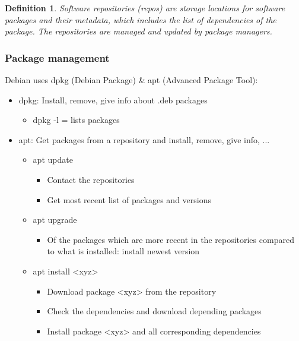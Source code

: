\documentclass{article}
\newtheorem{theorem}{Definition}[section]
\begin{document}
\begin{theorem}
    Software repositories (repos) are storage locations for software packages and their metadata, 
    which includes the list of dependencies of the package. The repositories are managed and updated by package managers. 
\end{theorem}
   

\subsubsection{Package management}

Debian uses dpkg (Debian Package) \& apt (Advanced Package Tool):

\begin{itemize}
    \item dpkg: Install, remove, give info about .deb packages
    \begin{itemize}
        \item dpkg -l = lists packages 
    \end{itemize}
    \item apt: Get packages from a repository and install, remove, give info, ...
    \begin{itemize}
        \item apt update
        \begin{itemize}
            \item Contact the repositories
            \item Get most recent list of packages and versions
        \end{itemize}
        \item apt upgrade
        \begin{itemize}
            \item Of the packages which are more recent in the repositories compared to what is installed: install newest version
        \end{itemize}
        \item apt install <xyz>
        \begin{itemize}
            \item Download package <xyz> from the repository
            \item Check the dependencies and download depending packages
            \item Install package <xyz> and all corresponding dependencies
        \end{itemize}
    \end{itemize}
\end{itemize}
\end{document}
